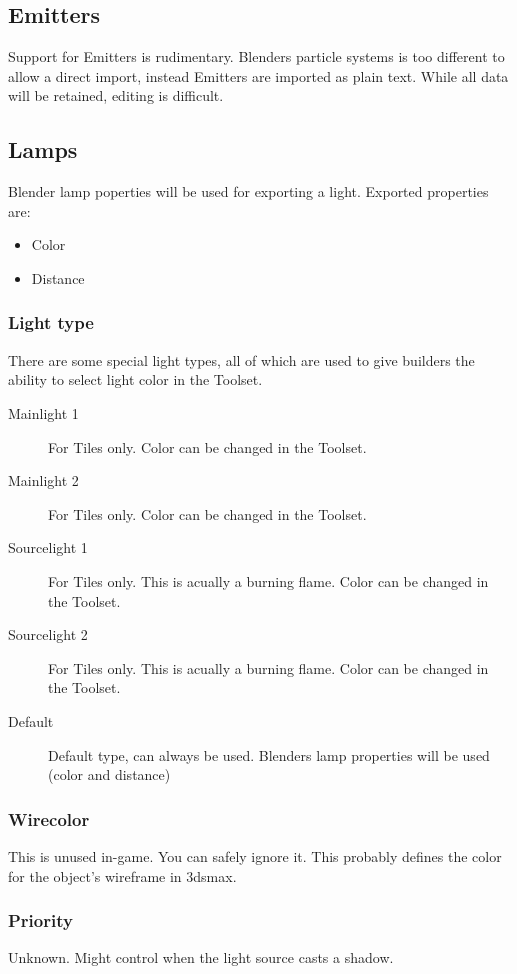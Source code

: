 \subsection{Emitters}
Support for Emitters is rudimentary. Blenders particle systems is too
different to allow a direct import, instead Emitters are imported as plain
text. While all data will be retained, editing is difficult.

\subsection{Lamps}
Blender lamp poperties will be used for exporting a light.
Exported properties are:
\begin{itemize}
\item Color
\item Distance
\end{itemize}

\subsubsection*{Light type}
There are some special light types, all of which are used to give builders
the ability to select light color in the Toolset.
\begin{description}
    \item[Mainlight 1] For Tiles only. Color can be changed in the Toolset.
    \item[Mainlight 2] For Tiles only. Color can be changed in the Toolset.
    \item[Sourcelight 1] For Tiles only. This is acually a burning flame. Color can be changed in the Toolset.
    \item[Sourcelight 2] For Tiles only. This is acually a burning flame. Color can be changed in the Toolset.
    \item[Default] Default type, can always be used. Blenders lamp properties will be used (color and distance)
\end{description}

\subsubsection*{Wirecolor}
This is unused in-game. You can safely ignore it. This probably defines the
color for the object's wireframe in 3dsmax.

\subsubsection*{Priority}
Unknown. Might control when the light source casts a shadow.

